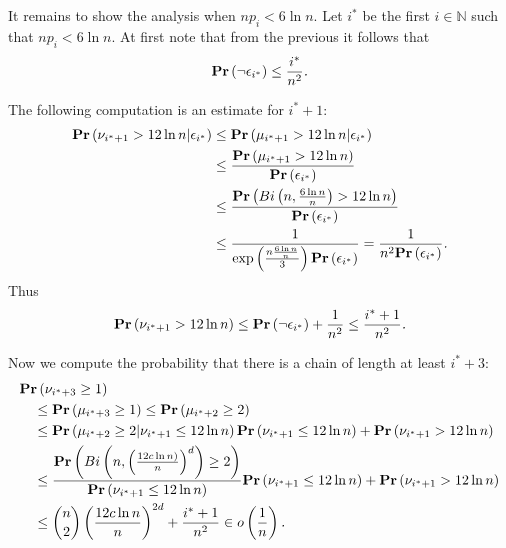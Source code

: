 It remains to show the analysis when $np_i < 6 \ln n$. Let $i^*$ be the first $i \in \mathbb{N}$ such that $np_i < 6\ln n$. 
At first note that from the previous it follows that 
\[
\mathbf{Pr}\left(\neg \epsilon_{i^*}\right) \leq \frac{i^*}{n ^ 2} \textit{.}
\]

The following computation is an estimate for $i^* + 1$:
\[
\begin{split}
\mathbf{Pr}\left(\nu_{i^* + 1} > 12 \ln n | \epsilon_{i^*}\right) 
	& \leq \mathbf{Pr}\left(\mu_{i^* + 1} > 12 \ln n | \epsilon_{i^*}\right) \\
	& \leq \frac{\mathbf{Pr}\left(\mu_{i^* + 1} > 12 \ln n\right)}{\mathbf{Pr}\left(\epsilon_{i^*}\right)} \\
	& \leq \frac{\mathbf{Pr}\left(Bi\left(n, \frac{6 \ln n}{n}\right) > 12 \ln n\right)}{\mathbf{Pr}\left(\epsilon_{i^*}\right)} \\
	& \leq \frac{1}{\exp\left(\frac{n\frac{6 \ln n}{n}}{3}\right)\mathbf{Pr}\left(\epsilon_{i^*}\right)} = \frac{1}{n ^ 2 \mathbf{Pr}\left(\epsilon_{i^*}\right)} \textit{.}
\end{split}
\]
Thus
\[
\mathbf{Pr}\left(\nu_{i^* + 1} > 12 \ln n\right) \leq \mathbf{Pr}\left(\neg \epsilon_{i^*}\right) + \frac{1}{n ^ 2} \leq \frac{i^* + 1}{n ^ 2} \textit{.}
\]

Now we compute the probability that there is a chain of length at least $i^* + 3$:
\[
\begin{split}
& \mathbf{Pr}\left(\nu_{i^* + 3} \geq 1\right) \\
	& \quad \leq \mathbf{Pr}\left(\mu_{i^* + 3} \geq 1\right) \leq \mathbf{Pr}\left(\mu_{i^* + 2} \geq 2\right) \\
	& \quad \leq \mathbf{Pr}\left(\mu_{i^* + 2} \geq 2 | \nu_{i^* + 1} \leq 12 \ln n\right)\mathbf{Pr}\left(\nu_{i^* + 1} \leq 12 \ln n\right) + \mathbf{Pr}\left(\nu_{i^* + 1} > 12 \ln n\right) \\
	& \quad \leq \frac{\mathbf{Pr}\left(Bi\left(n, \left(\frac{12 c \ln n)}{n}\right) ^ d\right) \geq 2\right)}{\mathbf{Pr}\left(\nu_{i^* + 1} \leq 12 \ln n\right)}\mathbf{Pr}\left(\nu_{i^* + 1} \leq 12 \ln n\right) + \mathbf{Pr}\left(\nu_{i^* + 1} > 12 \ln n\right) \\
	& \quad \leq \binom{n}{2} \left(\frac{12 c \ln n}{n}\right) ^ {2d} + \frac{i^* + 1}{n ^ 2} \in o\left(\frac{1}{n}\right) \textit{.}
\end{split}
\]

